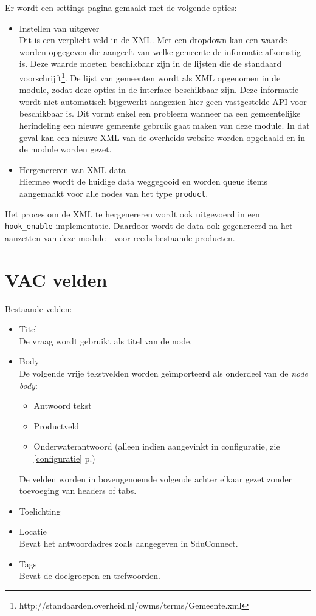 \documentclass[12pt]{article}
\newcommand{\seeonec}[1]{, zie \ref{#1} p.\pageref{#1}}
\begin{document}
Er wordt een settings-pagina gemaakt met de volgende opties:
\begin{itemize}
\item Instellen van uitgever \\
Dit is een verplicht veld in de XML. Met een dropdown kan een waarde worden opgegeven die aangeeft van welke gemeente de informatie afkomstig is. Deze waarde moeten beschikbaar zijn in de lijsten die de standaard voorschrijft\footnote{http://standaarden.overheid.nl/owms/terms/Gemeente.xml}. De lijst van gemeenten wordt als XML opgenomen in de module, zodat deze opties in de interface beschikbaar zijn. Deze informatie wordt niet automatisch bijgewerkt aangezien hier geen vastgestelde API voor beschikbaar is. Dit vormt enkel een probleem wanneer na een gemeentelijke herindeling een nieuwe gemeente gebruik gaat maken van deze module. In dat geval kan een nieuwe XML van de overheids-website worden opgehaald en in de module worden gezet.  
\item Hergenereren van XML-data \\
Hiermee wordt de huidige data weggegooid en worden queue items aangemaakt voor alle nodes van het type \texttt{product}.
\end{itemize}

Het proces om de XML te hergenereren wordt ook uitgevoerd in een \texttt{hook\_enable}-implementatie. Daardoor wordt de data ook gegenereerd na het aanzetten van deze module - voor reeds bestaande producten.

\clearpage
\appendix
\appendixpage\label{appendices}
\addappheadtotoc


\section{VAC velden}
Bestaande velden:
\begin{itemize}
\item Titel \\ De vraag wordt gebruikt als titel van de node.
\item Body \\
De volgende vrije tekstvelden worden ge\"{i}mporteerd als onderdeel van de \emph{node body}:
\begin{itemize}
\item Antwoord tekst
\item Productveld
\item Onderwaterantwoord (alleen indien aangevinkt in configuratie\seeonec{configuratie})
\end{itemize}
De velden worden in bovengenoemde volgende achter elkaar gezet zonder toevoeging van headers of tabs.
\item Toelichting
\item Locatie \\ Bevat het antwoordadres zoals aangegeven in SduConnect.
\item Tags \\ Bevat de doelgroepen en trefwoorden.
\end{itemize}
\end{document}
